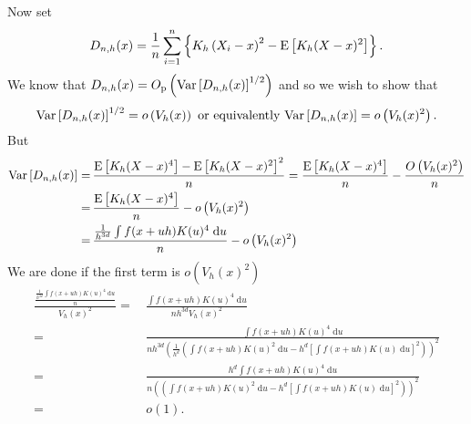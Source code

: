 Now set
\begin{equation*}
  D_{n, h} (x) = \frac{1}{n} \sum_{i = 1}^{n} \left\{ K_{h} \left( X_{i} - x
  \right)^{2} - \mathrm{E} \left[ K_{h} (X - x)^{2} \right] \right\}.
\end{equation*}
We know that \(D_{n, h} (x) = O_{\mathrm{p}} \left( \mathrm{Var} \left[ D_{n, h} (x)
\right]^{1 / 2} \right)\) and so we wish to show that
\begin{equation*}
  \mathrm{Var} \left[ D_{n, h} (x) \right]^{1 / 2} = o \left( V_{h} (x) \right) \text{
  or equivalently } \mathrm{Var} \left[ D_{n, h} (x) \right] = o \left( V_{h}
  (x)^{2} \right).
\end{equation*}
But
\begin{align*}
  \mathrm{Var} \left[ D_{n, h} (x) \right] =
  & \, \frac{\mathrm{E} \left[ K_{h} (X - x)^{4} \right] - \mathrm{E} \left[ K_{h} (X - x)^{2}
  \right]^{2}}{n} = \frac{\mathrm{E} \left[ K_{h} (X - x)^{4} \right]}{n} - \frac{O
  \left( V_{h} (x)^{2} \right)}{n} \\
  =
  & \, \frac{\mathrm{E} \left[ K_{h} (X - x)^{4} \right]}{n} - o \left( V_{h} (x)^{2}
  \right) \\
  =
  & \, \frac{\frac{1}{h^{3 d}} \int f (x + u h) K (u)^{4} \; \mathrm{d} u}{n} -
  o \left( V_{h} (x)^{2} \right)
\end{align*}
We are done if the first term is \(o \left( V_{h} (x)^{2} \right)\)
\begin{align*}
  \frac{\frac{\frac{1}{h^{3 d}} \int f (x + u h) K (u)^{4} \; \mathrm{d}
  u}{n}}{V_{h} (x)^{2}} =
  & \, \frac{\int f (x + u h) K (u)^{4} \; \mathrm{d} u}{n h^{3 d} V_{h}
  (x)^{2}} \\
  =
  & \, \frac{\int f (x + u h) K (u)^{4} \; \mathrm{d} u}{n h^{3 d} \left(
  \frac{1}{h^{d}} \left( \int f (x + u h) K (u)^{2} \; \mathrm{d} u - h^{d}
  \left[ \int f (x + u h) K (u) \; \mathrm{d} u \right]^{2} \right) \right)^{2}}
  \\
  =
  & \, \frac{h^{d} \int f (x + u h) K (u)^{4} \; \mathrm{d} u}{n \left(
  \left( \int f (x + u h) K (u)^{2} \; \mathrm{d} u - h^{d}
  \left[ \int f (x + u h) K (u) \; \mathrm{d} u \right]^{2} \right) \right)^{2}}
  \\
  =
  & \, o (1).
\end{align*}


